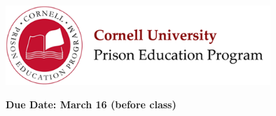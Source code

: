\documentclass[addpoints,12pt]{exam}
\begin{document}

\begin{flushright}
\vspace{0.2in}

\end{flushright}

\begin{center}
\includegraphics[width=10cm]{../images/logo.png}
\end{center}

\begin{center}
\end{center}

\noindent\begin{large}\textbf{Due Date: March 16 (before class)}\end{large}
\vspace{0.2in}
\end{document}
